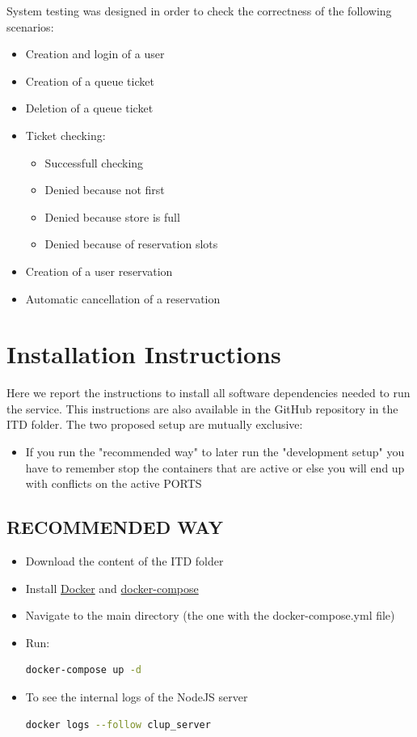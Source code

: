 \documentclass[
]{article}
\begin{document}
System testing was designed in order to check the correctness of the following scenarios:
\begin{itemize}
  \item Creation and login of a user
  \item Creation of a queue ticket
  \item Deletion of a queue ticket
  \item Ticket checking:
  \begin{itemize}
    \item Successfull checking
    \item Denied because not first
    \item Denied because store is full
    \item Denied because of reservation slots
  \end{itemize}
  \item Creation of a user reservation
  \item Automatic cancellation of a reservation
\end{itemize}

\hypertarget{installation-instructions}{%
\section{Installation Instructions}\label{installation-instructions}}

Here we report the instructions to install all software dependencies
needed to run the service. This instructions are also available in the
GitHub repository in the ITD folder.
The two proposed setup are mutually exclusive: 
\begin{itemize}
  \item If you run the "recommended way" to later run the "development setup" you have to remember stop the containers that are active or else you will end up with conflicts on the active PORTS
\end{itemize}

\subsection{RECOMMENDED WAY}\label{recommended-install}
\begin{itemize}
  \item Download the content of the ITD folder
  \item Install \href{https://docs.docker.com/get-docker/}{Docker} and \href{https://docs.docker.com/compose/install/}{docker-compose}
  \item Navigate to the main directory (the one with the docker-compose.yml file)
  \item Run: 
  \begin{lstlisting}[language=bash]
    docker-compose up -d
  \end{lstlisting}
  \item To see the internal logs of the NodeJS server
  \begin{lstlisting}[language=bash]
    docker logs --follow clup_server 
  \end{lstlisting}
\end{itemize}
\end{document}
